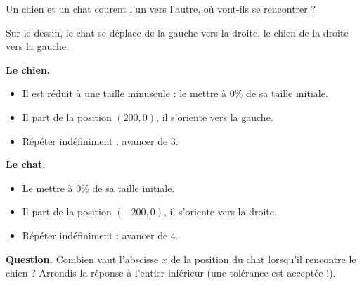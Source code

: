 \documentclass[class=report,crop=false, 12pt]{standalone}
\begin{document}

\begin{enigme}

Un chien et un chat courent l'un vers l'autre, où vont-ils se rencontrer ?


Sur le dessin, le chat se déplace de la gauche vers la droite, le chien de la droite vers la gauche.
\bigskip




\textbf{Le chien.}
\begin{itemize}
  \item Il est réduit à une taille minuscule : le mettre à $0 \%$ de sa taille initiale.
  \item Il part de la position $(200,0)$, il s'oriente vers la gauche.
  \item Répéter indéfiniment : avancer de $3$.
\end{itemize}

\textbf{Le chat.}
\begin{itemize}
  \item Le mettre à $0 \%$ de sa taille initiale.
  \item Il part de la position $(-200,0)$, il s'oriente vers la droite.
  \item Répéter indéfiniment : avancer de $4$.
\end{itemize}


\bigskip

\textbf{Question.} Combien vaut l'abscisse $x$ de la position du chat lorsqu'il rencontre le chien ?
Arrondis la réponse à l'entier inférieur (une tolérance est acceptée !).



\end{enigme}
\end{document}
